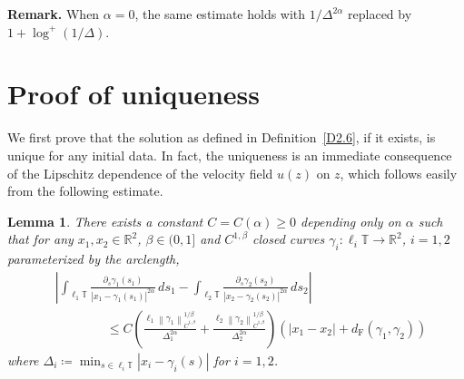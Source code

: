 \documentclass[reqno,centertags,12pt]{amsart}
\newtheorem{lemma}[theorem]{Lemma}
\theoremstyle{definition}
\numberwithin{equation}{section}
\newcommand{\abs}[1]{\left\lvert#1\right\rvert}
\newcommand{\norm}[1]{\left\|#1\right\|}
\newcommand{\bbR}{{\mathbb{R}}}
\newcommand{\bbT}{{\mathbb{T}}}
\begin{document}
\textbf{Remark.} When $\alpha=0$, the same estimate holds with $1/\Delta^{2\alpha}$
replaced by $1+\log^{+}(1/\Delta)$.


\section{Proof of uniqueness}

We first prove that the solution as defined in Definition~\ref{D2.6},
if it exists, is unique for any initial data. In fact, the uniqueness is an immediate
consequence of the Lipschitz dependence of the velocity field $u(z)$ on $z$,
which follows easily from the following estimate.

\begin{lemma}\label{L5.1}
    There exists a constant $C=C(\alpha)\geq 0$ depending only on $\alpha$ such that
    for any $x_{1},x_{2}\in\bbR^{2}$, $\beta\in(0,1]$ and $C^{1,\beta}$ closed curves
    $\gamma_{i}\colon\ell_{i}\bbT\to\bbR^{2}$, $i=1,2$ parameterized by the arclength,
    \begin{align*}
        &\abs{\int_{\ell_{1}\bbT}\frac{\partial_{s}\gamma_{1}(s_{1})}
        {\abs{x_{1} - \gamma_{1}(s_{1})}^{2\alpha}}\,ds_{1}
        - \int_{\ell_{2}\bbT}\frac{\partial_{s}\gamma_{2}(s_{2})}
        {\abs{x_{2} - \gamma_{2}(s_{2})}^{2\alpha}}\,ds_{2}} \\
        &\quad\quad\quad\quad\leq
        C\left(
            \frac{\ell_{1}\norm{\gamma_{1}}_{\dot{C}^{1,\beta}}^{1/\beta}}
            {\Delta_{1}^{2\alpha}}
            + \frac{\ell_{2}\norm{\gamma_{2}}_{\dot{C}^{1,\beta}}^{1/\beta}}
            {\Delta_{2}^{2\alpha}}
        \right)
        \left(\abs{x_{1}-x_{2}} + d_{\mathrm{F}}(\gamma_{1},\gamma_{2})\right)
    \end{align*}
    where $\Delta_{i}\coloneqq \min_{s\in\ell_{i}\bbT}\abs{x_{i} - \gamma_{i}(s)}$
    for $i=1,2$.
\end{lemma}
\end{document}
